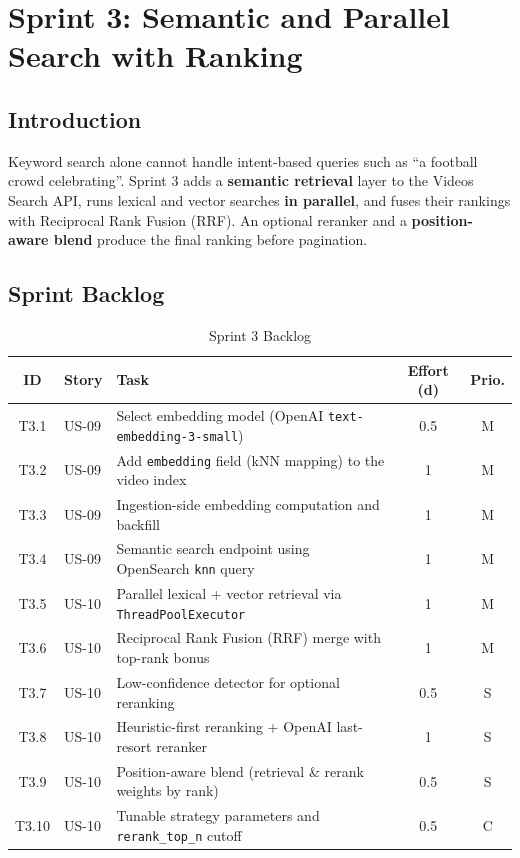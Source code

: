 \chapter{Sprint 3: Semantic and Parallel Search with Ranking}

\section*{Introduction}

Keyword search alone cannot handle intent-based queries such as ``a football crowd celebrating''.
Sprint 3 adds a \textbf{semantic retrieval} layer to the Videos Search API, runs lexical and
vector searches \textbf{in parallel}, and fuses their rankings with Reciprocal Rank Fusion
(RRF). An optional reranker and a \textbf{position-aware blend} produce the final ranking before
pagination.

\section{Sprint Backlog}

\begin{table}[H]
\centering
\caption{Sprint 3 Backlog}
\label{tab:sprint3_backlog}
\begin{tabularx}{\textwidth}{clXcc}
\toprule
\textbf{ID} & \textbf{Story} & \textbf{Task} & \textbf{Effort (d)} & \textbf{Prio.} \\
\midrule
T3.1 & US-09 & Select embedding model (OpenAI \texttt{text-embedding-3-small})     & 0.5 & M \\
T3.2 & US-09 & Add \texttt{embedding} field (kNN mapping) to the video index       & 1 & M \\
T3.3 & US-09 & Ingestion-side embedding computation and backfill                   & 1 & M \\
T3.4 & US-09 & Semantic search endpoint using OpenSearch \texttt{knn} query        & 1 & M \\
T3.5 & US-10 & Parallel lexical + vector retrieval via \texttt{ThreadPoolExecutor} & 1 & M \\
T3.6 & US-10 & Reciprocal Rank Fusion (RRF) merge with top-rank bonus              & 1 & M \\
T3.7 & US-10 & Low-confidence detector for optional reranking                      & 0.5 & S \\
T3.8 & US-10 & Heuristic-first reranking + OpenAI last-resort reranker            & 1 & S \\
T3.9 & US-10 & Position-aware blend (retrieval \& rerank weights by rank)           & 0.5 & S \\
T3.10 & US-10 & Tunable strategy parameters and \texttt{rerank\_top\_n} cutoff      & 0.5 & C \\
\bottomrule
\end{tabularx}
\end{table}


